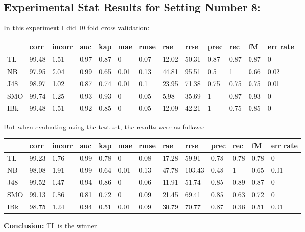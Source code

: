 \documentclass[a4paper,12pt, english]{article}
\begin{document}
\subsection{Experimental Stat Results for Setting Number 8:}
In this experiment I did 10 fold cross validation:
\begin{small}
\begin{center}
    \begin{tabular}{ | l | l | l | l | l | l | l | l | l | l | l | l | l |}
    \hline
      	& corr & incorr  & auc & kap & mae & rmse & rae & rrse & prec & rec & fM & err rate\\ \hline
      	TL & 99.48 & 0.51 & 0.97 & 0.87 & 0 & 0.07 & 12.02 & 50.31 & 0.87 & 0.87 & 0.87 & 0\\ \hline
	NB & 97.95 & 2.04 & 0.99 & 0.65 & 0.01 & 0.13 & 44.81 & 95.51 & 0.5 & 1 & 0.66 & 0.02\\ \hline
	J48 & 98.97 & 1.02 & 0.87 & 0.74 & 0.01 & 0.1 & 23.95 & 71.38 & 0.75 & 0.75 & 0.75 & 0.01\\ \hline
	SMO & 99.74 & 0.25 & 0.93 & 0.93 & 0 & 0.05 & 5.98 & 35.69 & 1 & 0.87 & 0.93 & 0\\ \hline
	IBk & 99.48 & 0.51 & 0.92 & 0.85 & 0 & 0.05 & 12.09 & 42.21 & 1 & 0.75 & 0.85 & 0\\ \hline  
    \end{tabular}       
\end{center}
\end{small}

But when evaluating using the test set, the results were as follows:
\begin{small}
\begin{center}
    \begin{tabular}{ | l | l | l | l | l | l | l | l | l | l | l | l | l |}
    \hline
      	& corr & incorr  & auc & kap & mae & rmse & rae & rrse & prec & rec & fM & err rate\\ \hline
      	TL & 99.23 & 0.76 & 0.99 & 0.78 & 0 & 0.08 & 17.28 & 59.91 & 0.78 & 0.78 & 0.78 & 0\\ \hline
	NB & 98.08 & 1.91 & 0.99 & 0.64 & 0.01 & 0.13 & 47.78 & 103.43 & 0.48 & 1 & 0.65 & 0.01\\ \hline
	J48 & 99.52 & 0.47 & 0.94 & 0.86 & 0 & 0.06 & 11.91 & 51.74 & 0.85 & 0.89 & 0.87 & 0\\ \hline
	SMO & 99.13 & 0.86 & 0.81 & 0.72 & 0 & 0.09 & 21.45 & 69.41 & 0.85 & 0.63 & 0.72 & 0\\ \hline
	IBk & 98.75 & 1.24 & 0.94 & 0.51 & 0.01 & 0.09 & 30.79 & 70.77 & 0.87 & 0.36 & 0.51 & 0.01\\ \hline  
    \end{tabular}       
\end{center}
\end{small}
\textbf{Conclusion:} TL is the winner
\end{document}
